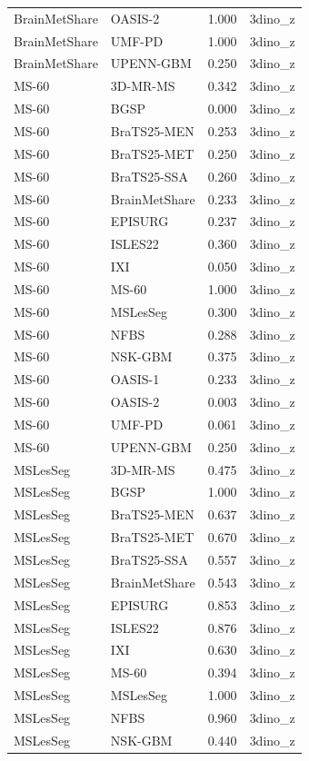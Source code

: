 \begin{tabular}{llrl}
BrainMetShare & OASIS-2 & 1.000 & 3dino\_z \\
BrainMetShare & UMF-PD & 1.000 & 3dino\_z \\
BrainMetShare & UPENN-GBM & 0.250 & 3dino\_z \\
MS-60 & 3D-MR-MS & 0.342 & 3dino\_z \\
MS-60 & BGSP & 0.000 & 3dino\_z \\
MS-60 & BraTS25-MEN & 0.253 & 3dino\_z \\
MS-60 & BraTS25-MET & 0.250 & 3dino\_z \\
MS-60 & BraTS25-SSA & 0.260 & 3dino\_z \\
MS-60 & BrainMetShare & 0.233 & 3dino\_z \\
MS-60 & EPISURG & 0.237 & 3dino\_z \\
MS-60 & ISLES22 & 0.360 & 3dino\_z \\
MS-60 & IXI & 0.050 & 3dino\_z \\
MS-60 & MS-60 & 1.000 & 3dino\_z \\
MS-60 & MSLesSeg & 0.300 & 3dino\_z \\
MS-60 & NFBS & 0.288 & 3dino\_z \\
MS-60 & NSK-GBM & 0.375 & 3dino\_z \\
MS-60 & OASIS-1 & 0.233 & 3dino\_z \\
MS-60 & OASIS-2 & 0.003 & 3dino\_z \\
MS-60 & UMF-PD & 0.061 & 3dino\_z \\
MS-60 & UPENN-GBM & 0.250 & 3dino\_z \\
MSLesSeg & 3D-MR-MS & 0.475 & 3dino\_z \\
MSLesSeg & BGSP & 1.000 & 3dino\_z \\
MSLesSeg & BraTS25-MEN & 0.637 & 3dino\_z \\
MSLesSeg & BraTS25-MET & 0.670 & 3dino\_z \\
MSLesSeg & BraTS25-SSA & 0.557 & 3dino\_z \\
MSLesSeg & BrainMetShare & 0.543 & 3dino\_z \\
MSLesSeg & EPISURG & 0.853 & 3dino\_z \\
MSLesSeg & ISLES22 & 0.876 & 3dino\_z \\
MSLesSeg & IXI & 0.630 & 3dino\_z \\
MSLesSeg & MS-60 & 0.394 & 3dino\_z \\
MSLesSeg & MSLesSeg & 1.000 & 3dino\_z \\
MSLesSeg & NFBS & 0.960 & 3dino\_z \\
MSLesSeg & NSK-GBM & 0.440 & 3dino\_z \\

\end{tabular}
